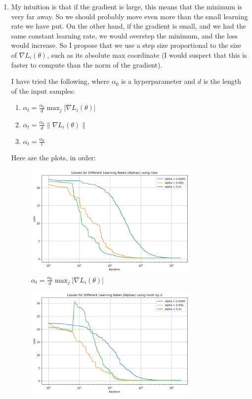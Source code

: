 \documentclass[12pt]{article}
\theoremstyle{definitionstyle}
\begin{document}
\begin{enumerate}[leftmargin=\labelsep]
\begin{enumerate}[label=(\alph*)]
            \item 
            My intuition is that if the gradient is large, this means that the minimum is very far away. So we should probably move even more than the small learning rate we have put. On the other hand, if the gradient is small, and we had the same constant learning rate, we would overstep the minimum, and the loss would increase. So I propose that we use a step size proportional to the size of $\nabla L_i(\theta)$, such as its absolute max coordinate (I would suspect that this is faster to compute than the norm of the gradient).

            I have tried the following, where $\alpha_0$ is a hyperparameter and $d$ is the length of the input samples:
            \begin{enumerate}
                \item $\alpha_t = \frac{\alpha_0}{d} \max_{j} |\nabla L_i(\theta)|$
                \item $\alpha_t = \frac{\alpha_0}{d} \|\nabla L_i(\theta)\|$
                \item $\alpha_t = \frac{\alpha_0}{t}$
            \end{enumerate}
            Here are the plots, in order:
            \begin{figure}[H]
                \centering
                \includegraphics[width=0.8\textwidth]{sgd_max.png}
                \caption{$\alpha_t = \frac{\alpha_0}{d} \max_{j} |\nabla L_i(\theta)|$}
                \label{fig:adaptive_alpha_1}
            \end{figure}
            \begin{figure}[H]
                \centering
                \includegraphics[width=0.8\textwidth]{sgd_norm_d.png}

\end{figure}
\end{enumerate}
\end{enumerate}
\end{document}

